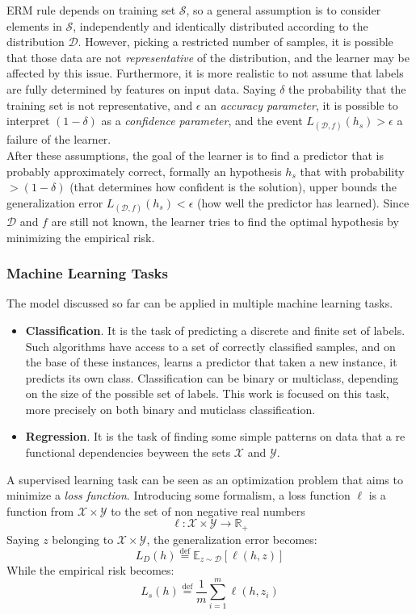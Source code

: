\ac{ERM} rule depends on training set $\mathcal{S}$, so a general assumption is to consider elements in $\mathcal{S}$, independently and identically distributed according to the distribution $\mathcal{D}$. However, picking a restricted number of samples, it is possible that those data are not \textit{representative} of the distribution, and the learner may be affected by this issue. Furthermore, it is more realistic to not assume that labels are fully determined by features on input data. Saying $\delta$ the probability that the training set is not representative, and $\epsilon$ an \textit{accuracy parameter}, it is possible to interpret $(1-\delta)$ as a \textit{confidence parameter}, and the event $L_{(\mathcal{D},f)}(h_s) > \epsilon$ a failure of the learner.\\
After these assumptions, the goal of the learner is to find a predictor that is probably approximately correct, formally an hypothesis $h_s$ that with probability $> (1-\delta)$ (that determines how confident is the solution), upper bounds the generalization error $L_{(\mathcal{D},f)}(h_s) < \epsilon$ (how well the predictor has learned). Since $\mathcal{D}$ and $f$ are still not known, the learner tries to find the optimal hypothesis by minimizing the empirical risk.\\

\subsubsection{Machine Learning Tasks}
The model discussed so far can be applied in multiple machine learning tasks.
\begin{itemize}
	\item \textbf{Classification}. It is the task of predicting a discrete and finite set of labels. Such algorithms have access to a set of correctly classified samples, and on the base of these instances, learns a predictor that taken a new instance, it predicts its own class. Classification can be binary or multiclass, depending on the size of the possible set of labels. This work is focused on this task, more precisely on both binary and muticlass classification.
	\item \textbf{Regression}. It is the task of finding some simple patterns on data that a re functional dependencies beyween the sets $\mathcal{X}$ and $\mathcal{Y}$.
\end{itemize}

A supervised learning task can be seen as an optimization problem that aims to minimize a \textit{loss function}. Introducing some formalism, a loss function $\ell$ is a function from $\mathcal{X} \times \mathcal{Y}$ to the set of non negative real numbers
\[\ell: \mathcal{X} \times \mathcal{Y} \rightarrow \mathbb{R}_+\]
Saying $z$ belonging to $\mathcal{X} \times \mathcal{Y}$, the generalization error becomes:
\[L_D(h) \stackrel{\text{def}}{=} \mathbb{E}_{z \sim \mathcal{D}}[\ell (h,z)]\]
While the empirical risk becomes:
\[L_s(h)\stackrel{\text{def}}{=} \frac{1}{m} \sum_{i=1}^{m} \ell (h, z_i)\]

